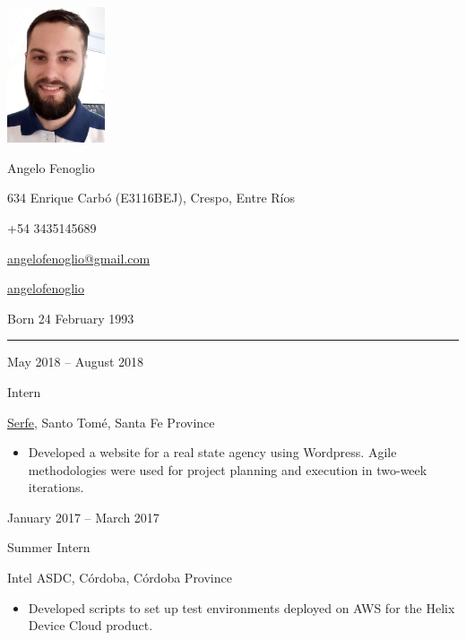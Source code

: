 \documentclass[a4paper,10pt]{article}
\newlength{\cvcolumngapwidth}
\newlength{\cvleftcolumnwidth}
\newlength{\cvrightcolumnwidth}
\newcommand{\cvnamestyle}[1]{{\Huge\cvnamefont\textcolor{cvnamecolor}{#1}}}
\newcommand{\cvsectionstyle}[1]{{\normalsize\cvsectionfont\textcolor{cvsectioncolor}{#1}}}
\newcommand{\cvtitlestyle}[1]{{\large\cvtitlefont\textcolor{cvtitlecolor}{#1}}}
\newcommand{\cvdurationstyle}[1]{{\small\cvdurationfont\textcolor{cvdurationcolor}{#1}}}
\newlength{\cvafteritemskipamount}
\newlength{\cvaftersectionskipamount}
\newlength{\cvafternameskipamount}
\newlength{\cvafterpersonalinfolineskipamount}
\newlength{\cvaftertitleskipamount}
\newlength{\cvparskip}
\newcommand{\cvpersonalinfo}[2]{
    \begin{minipage}[t]{\cvleftcolumnwidth}
        \vspace{0mm} %
        \raggedleft #1
    \end{minipage}%
    \hspace{\cvcolumngapwidth}%
    \begin{minipage}[t]{\cvrightcolumnwidth}
        \vspace{0mm} %
        #2
    \end{minipage}

    \vspace{\cvafteritemskipamount}
}
\newcommand{\cvname}[1]{
    \cvnamestyle{#1}

    \vspace{\cvafternameskipamount}
}
\newcommand{\cvpersonalinfolinewithicon}[3]{
    \raisebox{.5\fontcharht\font`E-.5\height}{\texttt{[image: \#2]}}
    #3

    \vspace{\cvafterpersonalinfolineskipamount}
}
\newcommand{\cvsection}[1]{
    \begin{minipage}[t]{\cvleftcolumnwidth}
        \raggedleft\cvsectionstyle{#1}
    \end{minipage}%
    \hspace{\cvcolumngapwidth}%
    \begin{minipage}[t]{\cvrightcolumnwidth}
        \textcolor{cvrulecolor}{\rule{\cvrightcolumnwidth}{0.3mm}}
    \end{minipage}

    \vspace{\cvaftersectionskipamount}
}
\newcommand{\cvitem}[2]{
    \begin{minipage}[t]{\cvleftcolumnwidth}
        \raggedleft #1
    \end{minipage}%
    \hspace{\cvcolumngapwidth}%
    \begin{minipage}[t]{\cvrightcolumnwidth}
        \setlength{\parskip}{\cvparskip} #2
    \end{minipage}

    \vspace{\cvafteritemskipamount}
}
\newcommand{\cvtitle}[1]{
    \cvtitlestyle{#1}

    \vspace{\cvaftertitleskipamount}
    \vspace{-\cvparskip}
}
\begin{document}

\cvpersonalinfo{
    \includegraphics[height=40mm]{cvphoto.png}
}{
    \cvname{Angelo Fenoglio}

    \cvpersonalinfolinewithicon{height=4mm}{072-location.pdf}{
        634 Enrique Carbó (E3116BEJ), Crespo, Entre Ríos
    }

    \cvpersonalinfolinewithicon{height=4mm}{067-phone.pdf}{
        +54 3435145689
    }

    \cvpersonalinfolinewithicon{height=4mm}{070-envelop.pdf}{
        \href{mailto:angelofenoglio@gmail.com}{angelofenoglio@gmail.com}
    }

    \cvpersonalinfolinewithicon{height=4mm}{458-linkedin.pdf}{
        \href{https://www.linkedin.com/in/angelofenoglio/}{angelofenoglio}
    }

    Born 24 February 1993
}



\cvsection{WORK EXPERIENCE}

\cvitem{
    \cvdurationstyle{May 2018 -- August 2018}
}{
    \cvtitle{Intern}

    \href{https://www.serfe.com/en/}{Serfe}, Santo Tomé, Santa Fe Province

    \begin{itemize}[leftmargin=*]
        \item Developed a website for a real state agency using Wordpress. Agile methodologies were used for project planning and execution in two-week iterations.
    \end{itemize}
}

\cvitem{
    \cvdurationstyle{January 2017 -- March 2017}
}{
    \cvtitle{Summer Intern}

    Intel ASDC, Córdoba, Córdoba Province

    \begin{itemize}[leftmargin=*]
        \item Developed scripts to set up test environments deployed on AWS for the Helix Device Cloud product. 
    \end{itemize}
}
\end{document}
